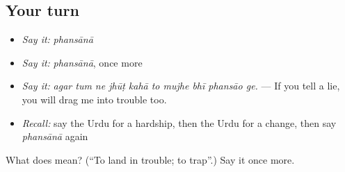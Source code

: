 \subsection*{Your turn}
\begin{itemize}
\raggedright
  \item \emph{Say it:} \emph{phansānā}
  \item \emph{Say it:} \emph{phansānā}, once more
  \item \emph{Say it:} \emph{agar tum ne jhūṭ kahā to mujhe bhī phansāo ge.} — If you tell a lie, you will drag me into trouble too.
  \item \emph{Recall:} say the Urdu for a hardship, then the Urdu for a change, then say \emph{phansānā} again
\end{itemize}

\begin{tcolorbox}[breakable,colback=teal!4,colframe=teal!35!black,title={Before you move on}]
What does  mean? (\textquotedblleft{}To land in trouble; to trap\textquotedblright{}.) Say it once more.
\end{tcolorbox}
